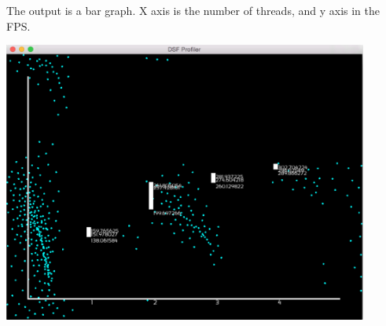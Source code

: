  The output is a bar graph. X axis is the number of threads, and y axis in the F\+P\+S. 
\begin{DoxyImageNoCaption}
  \mbox{\includegraphics[width=12cm]{ReportDescriptionBenchmarkOutput.png}}
\end{DoxyImageNoCaption}
 